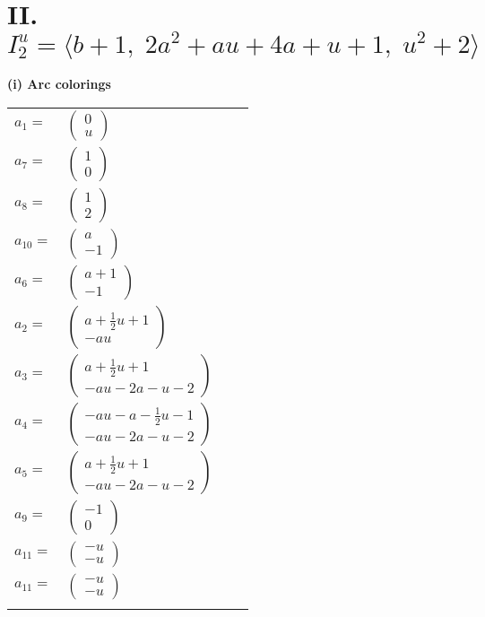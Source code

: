 \documentclass[1p]{elsarticle_modified}
\theoremstyle{definition}
\begin{document}
\centering \section*{II. $I^u_{2}= \langle b+1,\;2 a^2+a u+4 a+u+1,\;u^2+2 \rangle$}
\flushleft \textbf{(i) Arc colorings}\\
\begin{tabular}{m{7pt} m{180pt} m{7pt} m{180pt} }
\flushright $a_{1}=$&$\begin{pmatrix}0\\u\end{pmatrix}$ \\
\flushright $a_{7}=$&$\begin{pmatrix}1\\0\end{pmatrix}$ \\
\flushright $a_{8}=$&$\begin{pmatrix}1\\2\end{pmatrix}$ \\
\flushright $a_{10}=$&$\begin{pmatrix}a\\-1\end{pmatrix}$ \\
\flushright $a_{6}=$&$\begin{pmatrix}a+1\\-1\end{pmatrix}$ \\
\flushright $a_{2}=$&$\begin{pmatrix}a+\frac{1}{2} u+1\\- a u\end{pmatrix}$ \\
\flushright $a_{3}=$&$\begin{pmatrix}a+\frac{1}{2} u+1\\- a u-2 a- u-2\end{pmatrix}$ \\
\flushright $a_{4}=$&$\begin{pmatrix}- a u- a-\frac{1}{2} u-1\\- a u-2 a- u-2\end{pmatrix}$ \\
\flushright $a_{5}=$&$\begin{pmatrix}a+\frac{1}{2} u+1\\- a u-2 a- u-2\end{pmatrix}$ \\
\flushright $a_{9}=$&$\begin{pmatrix}-1\\0\end{pmatrix}$ \\
\flushright $a_{11}=$&$\begin{pmatrix}- u\\- u\end{pmatrix}$\\ \flushright $a_{11}=$&$\begin{pmatrix}- u\\- u\end{pmatrix}$\\&\end{tabular}
\end{document}
